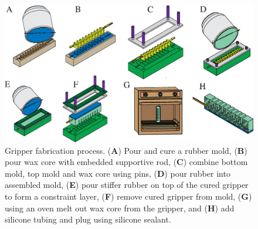 \begin{figure}[htb]
\centering
   \includegraphics[width=0.98\columnwidth]{figures/robotic_gripper/fab_pleated_process_horizontal_no_labels.eps}
      \caption{Gripper fabrication process. (\textbf{A}) Pour and cure a rubber mold, (\textbf{B}) pour wax core with embedded supportive rod, (\textbf{C}) combine bottom mold, top mold and wax core using pins, (\textbf{D}) pour rubber into assembled mold, (\textbf{E}) pour stiffer rubber on top of the cured gripper to form a constraint layer, (\textbf{F}) remove cured gripper from mold, (\textbf{G}) using an oven melt out wax core from the gripper, and (\textbf{H}) add silicone tubing and plug using silicone sealant.}
      \label{fig:fabrication}
\end{figure}

